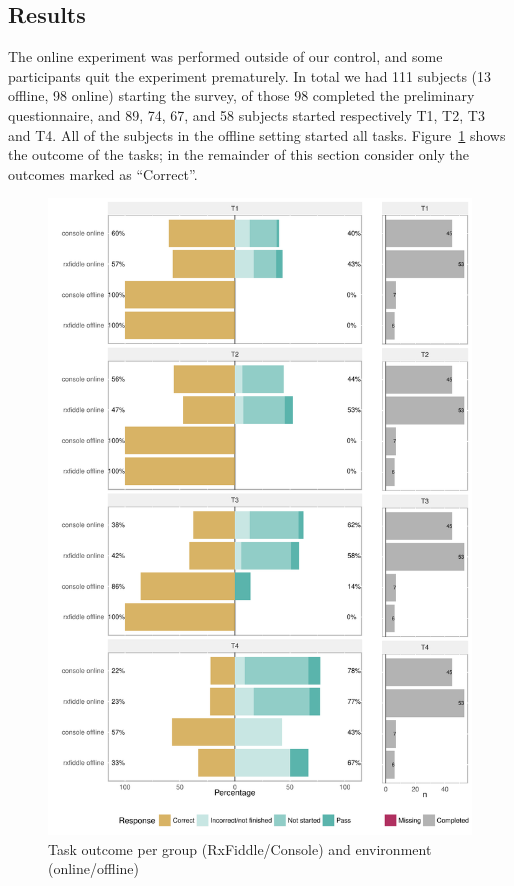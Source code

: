 \subsection{Results} The online experiment was performed outside of our
control, and some participants quit the experiment prematurely.  In
total we had 111 subjects (13 offline, 98 online) starting the survey,
of those 98 completed the preliminary questionnaire, and
89, 74, 67, and 58 subjects
started respectively T1, T2, T3 and T4.  All of the
subjects in the offline setting started all tasks.
Figure~\ref{fig:resultPerTask} shows the outcome of the tasks; in the
remainder of this section consider only the outcomes marked as ``Correct''.

\begin{figure}[t]
    \includegraphics[width=\columnwidth]{images/resultPerTask.pdf}
    \caption{Task outcome per group (RxFiddle/Console) and environment (online/offline)}
    \label{fig:resultPerTask}
\end{figure}


